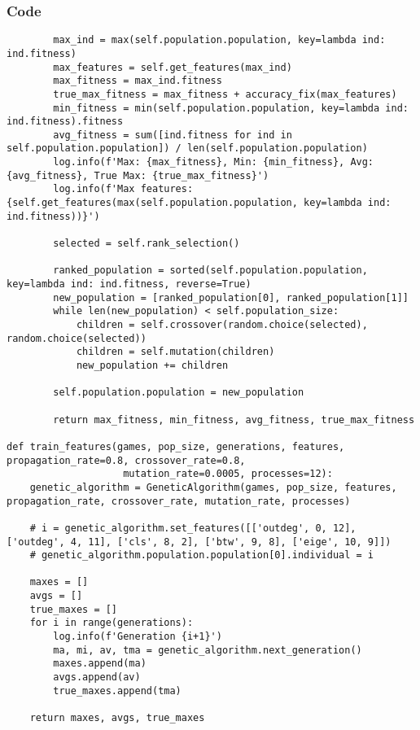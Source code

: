 \documentclass{beamer}
\begin{document}
\begin{frame}[t, fragile]
    \frametitle{Code}
    \fontsize{3pt}{5pt}\selectfont
    \begin{verbatim}
        max_ind = max(self.population.population, key=lambda ind: ind.fitness)
        max_features = self.get_features(max_ind)
        max_fitness = max_ind.fitness
        true_max_fitness = max_fitness + accuracy_fix(max_features)
        min_fitness = min(self.population.population, key=lambda ind: ind.fitness).fitness
        avg_fitness = sum([ind.fitness for ind in self.population.population]) / len(self.population.population)
        log.info(f'Max: {max_fitness}, Min: {min_fitness}, Avg: {avg_fitness}, True Max: {true_max_fitness}')
        log.info(f'Max features: {self.get_features(max(self.population.population, key=lambda ind: ind.fitness))}')

        selected = self.rank_selection()

        ranked_population = sorted(self.population.population, key=lambda ind: ind.fitness, reverse=True)
        new_population = [ranked_population[0], ranked_population[1]]
        while len(new_population) < self.population_size:
            children = self.crossover(random.choice(selected), random.choice(selected))
            children = self.mutation(children)
            new_population += children
        
        self.population.population = new_population

        return max_fitness, min_fitness, avg_fitness, true_max_fitness   

def train_features(games, pop_size, generations, features, propagation_rate=0.8, crossover_rate=0.8,
                    mutation_rate=0.0005, processes=12):
    genetic_algorithm = GeneticAlgorithm(games, pop_size, features, propagation_rate, crossover_rate, mutation_rate, processes)

    # i = genetic_algorithm.set_features([['outdeg', 0, 12], ['outdeg', 4, 11], ['cls', 8, 2], ['btw', 9, 8], ['eige', 10, 9]])
    # genetic_algorithm.population.population[0].individual = i

    maxes = []
    avgs = []
    true_maxes = []
    for i in range(generations):
        log.info(f'Generation {i+1}')
        ma, mi, av, tma = genetic_algorithm.next_generation()
        maxes.append(ma)
        avgs.append(av)
        true_maxes.append(tma)

    return maxes, avgs, true_maxes
    \end{verbatim}
\end{frame}
\end{document}
